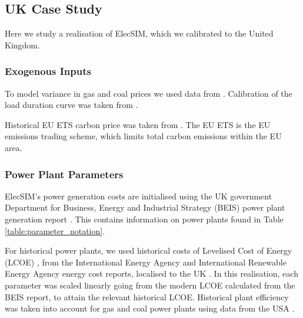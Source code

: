






\subsection{UK Case Study}

Here we study a realisation of ElecSIM, which we calibrated to the United Kingdom.

\subsubsection{Exogenous Inputs}

To model variance in gas and coal prices we used data from \cite{coalprices,gasprices}. Calibration of the load duration curve was taken from \cite{gbnationalgridstatus_2019}.

Historical EU ETS carbon price was taken from \cite{jones_moore_macdonald_macdonald_buckley_macdonald_2019}. The EU ETS is the EU emissions trading scheme, which limits total carbon emissions within the EU area.

\subsubsection{Power Plant Parameters}

ElecSIM's power generation costs are initialised using the UK government Department for Business, Energy and Industrial Strategy (BEIS) power plant generation report \cite{Department2016}. This contains information on power plants found in Table \ref{table:parameter_notation}.

For historical power plants, we used historical costs of Levelised Cost of Energy (LCOE) \cite{Dale2013}, from the International Energy Agency and International Renewable Energy Agency energy cost reports, localised to the UK \cite{IEA2015,IRENA2018}. In this realisation, each parameter was scaled linearly going from the modern LCOE calculated from the BEIS report, to attain the relevant historical LCOE. Historical plant efficiency was taken into account for gas and coal power plants using data from the USA \cite{EIA2013}.

